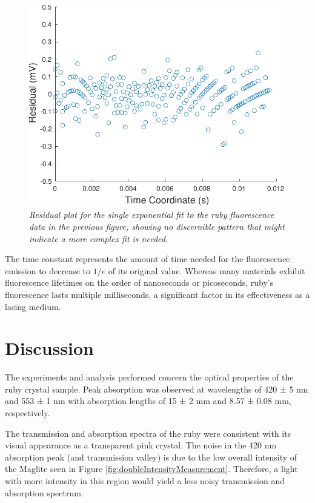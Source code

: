 \documentclass[11pt, a4paper, twocolumn]{article}
\begin{document}
\begin{figure} %
\includegraphics[width=\linewidth]{decayResiduals.pdf}
\caption{\textit{Residual plot for the single exponential fit to the ruby fluorescence data in the previous figure, showing no discernible pattern that might indicate a more complex fit is needed.}}
\label{fig:decayResiduals}
\end{figure}
\newpage
The time constant represents the amount of time needed for the fluorescence emission to decrease to $1/e$ of its original value. Whereas many materials exhibit fluorescence lifetimes on the order of nanoseconds or picoseconds, ruby’s fluorescence lasts multiple milliseconds, a significant factor in its effectiveness as a lasing medium.

\section*{Discussion}
The experiments and analysis performed concern the optical properties of the ruby crystal sample. Peak absorption was observed at wavelengths of 420 ± 5 nm and 553 ± 1 nm with absorption lengths of 15 ± 2 mm and 8.57 ± 0.08 mm, respectively. 

The transmission and absorption spectra of the ruby were consistent with its visual appearance as a transparent pink crystal. The noise in the 420 nm absorption peak (and transmission valley) is due to the low overall intensity of the Maglite seen in Figure \ref{fig:doubleIntensityMeasurement}. Therefore, a light with more intensity in this region would yield a less noisy transmission and absorption spectrum.
\end{document}
